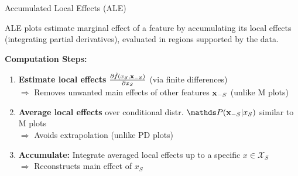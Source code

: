 \documentclass[10pt,compress,t,notes=noshow, xcolor=table]{beamer}
\begin{document}
\begin{frame}{Accumulated Local Effects (ALE) }

ALE plots estimate marginal effect of a feature by accumulating its local effects (integrating partial derivatives), evaluated in regions supported by the data. 



\medskip
\textbf{Computation Steps:}
\begin{enumerate}[<+->]
\item \textbf{Estimate local effects} $\frac{\partial \hat{f}(x_S, \mathbf{x}_{-S})}{\partial x_S}$ (via finite differences) \label{ref1}\\ %
$\Rightarrow$ Removes unwanted main effects of other features $\mathbf{x}_{-S}$ (unlike M plots)
\item \textbf{Average local effects} over conditional distr. $\P(\xv_{-S}|x_S)$ similar to M plots\\ %
$\Rightarrow$ Avoids extrapolation (unlike PD plots)\label{ref2}
\item \textbf{Accumulate:} Integrate averaged local effects up to a specific  $x \in \mathcal{X}_S$\\ %
$\Rightarrow$ Reconstructs main effect of $x_S$ \label{ref3}\\
\end{enumerate}

\end{frame}
\end{document}
